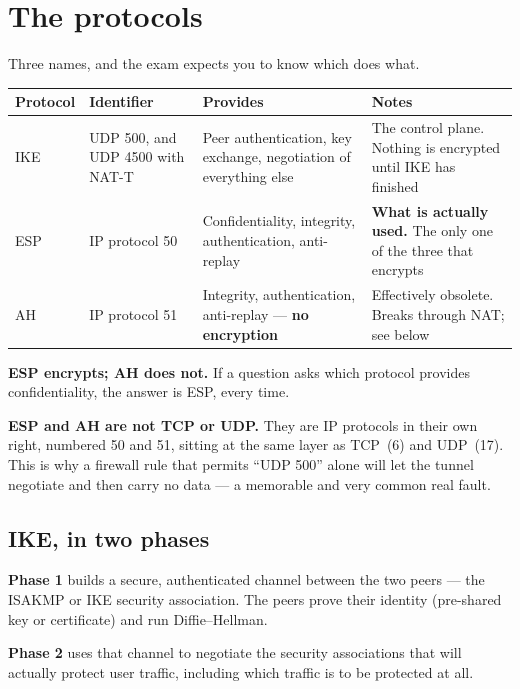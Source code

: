 \section{The protocols}

Three names, and the exam expects you to know which does what.

\begin{longtable}{@{}L{2.4cm}L{2.7cm}L{4.5cm}L{5.3cm}@{}}
\toprule
{}
\textbf{Protocol} & \textbf{Identifier} & \textbf{Provides} & \textbf{Notes} \\
\midrule
\endhead
IKE & UDP 500, and UDP 4500 with NAT-T &
Peer authentication, key exchange, negotiation of everything else &
The control plane. Nothing is encrypted until IKE has finished \\
ESP & IP protocol 50 &
Confidentiality, integrity, authentication, anti-replay &
\textbf{What is actually used.} The only one of the three that encrypts \\
AH & IP protocol 51 &
Integrity, authentication, anti-replay --- \textbf{no encryption} &
Effectively obsolete. Breaks through NAT; see below \\
\bottomrule
\end{longtable}

\begin{alertbox}
\textbf{ESP encrypts; AH does not.} If a question asks which protocol provides
confidentiality, the answer is ESP, every time.

\textbf{ESP and AH are not TCP or UDP.} They are IP protocols in their own right,
numbered 50 and 51, sitting at the same layer as TCP~(6) and UDP~(17). This is
why a firewall rule that permits ``UDP 500'' alone will let the tunnel negotiate
and then carry no data --- a memorable and very common real fault.
\end{alertbox}

\subsection{IKE, in two phases}

\begin{tight}
  \item \textbf{Phase 1} builds a secure, authenticated channel between the two
        peers --- the ISAKMP or IKE security association. The peers prove their
        identity (pre-shared key or certificate) and run Diffie--Hellman.
  \item \textbf{Phase 2} uses that channel to negotiate the security
        associations that will actually protect user traffic, including which
        traffic is to be protected at all.
\end{tight}

